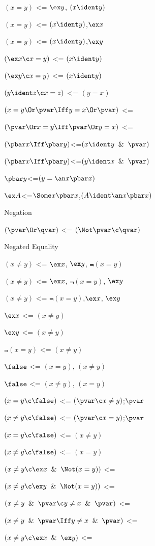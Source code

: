 $(x = y)$ <= $\ex y$, $(x \ident y)$

$(x = y)$ <=  $(x \ident y)$,$\ex x$

$(x = y)$ <=  $(x \ident y)$,$\ex y$

$(\ex x \c x = y)$ <=  $(x \ident y)$

$(\ex y \c x = y)$ <=  $(x \ident y)$

$(y\ident z \c x =z)$ <= $(y = x)$

$(x = y\Or \pvar \Iff y = x \Or \pvar)$ <=

$(\pvar \Or x = y \Iff \pvar \Or y = x)$ <=

$(\pbar x \Iff \pbar y)$<=$(x \ident y \And \pvar)$

$(\pbar x \Iff \pbar y)$<=$(y \ident x \And \pvar)$

$\pbar y$<=$(y = \an x \pbar x)$

$\ex A$<=$\Some x \pbar x$,$(A \ident \an x \pbar x)$

\lineb


Negation
\lineb

$(\pvar \Or \qvar)$ <= $(\Not \pvar \c \qvar)$
\lineb

Negated Equality
\lineb

$(x \ne y)$ <= $\ex x$, $\ex y$, $\Not (x = y)$

$(x \ne y)$ <= $\ex x$, $\Not(x = y)$, $\ex y$

$(x \ne y)$ <=  $\Not(x = y)$,$\ex x$, $\ex y$

$\ex x$ <= $(x \ne y)$

$\ex y$ <= $(x \ne y)$

$\Not (x = y)$ <= $(x \ne y)$

$\false$ <= $(x = y)$, $(x \ne y)$

$\false$ <= $(x \ne y)$, $(x = y)$

$(x = y \c \false)$ <=  $(\pvar \c x \ne y)$;$\pvar$

$(x \ne y \c \false)$ <=  $(\pvar \c x = y)$;$\pvar$

$(x = y \c \false)$ <=  $(x \ne y)$

$(x \ne y \c \false)$ <=  $(x = y)$

$(x \ne y \c \ex x \And \Not(x = y))$ <=

$(x \ne y \c \ex y \And \Not(x = y))$ <=

$(x \ne y \And \pvar \c y \ne x \And \pvar)$ <=

$(x \ne y \And \pvar \Iff y \ne x \And \pvar)$ <=

$(x \ne y \c \ex x \And \ex y )$ <=

